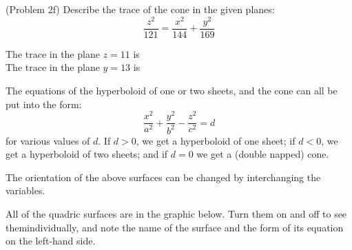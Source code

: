\documentclass[handout]{ximera}
\begin{document}
\begin{problem}(Problem 2f)
Describe the trace of the cone in the given planes:
\[
\frac{z^2}{121} = \frac{x^2}{144} + \frac{y^2}{169}
\]

The trace in the plane $z = 11$ is \\
The trace in the plane $y = 13$ is 
\end{problem}


The equations of the hyperboloid of one or two sheets, and the cone can all be put 
into the form:
\[
 \frac{x^2}{a^2} + \frac{y^2}{b^2} - \frac{z^2}{c^2} = d
\]
for various values of $d$.  
If $d > 0$, we get a hyperboloid of one sheet; 
if $d< 0$, we get a 
hyperboloid of two sheets; 
and if $d= 0$ we get a (double napped) cone.


\begin{center}
\end{center}

\begin{remark}
The orientation of the above surfaces can be changed by interchanging the variables.
\end{remark}


All of the quadric surfaces are in the graphic below. 
Turn them on and off to see themindividually, 
and note the name of the surface and the form of its equation on the left-hand side.

\begin{center}
\end{center}
\end{document}
